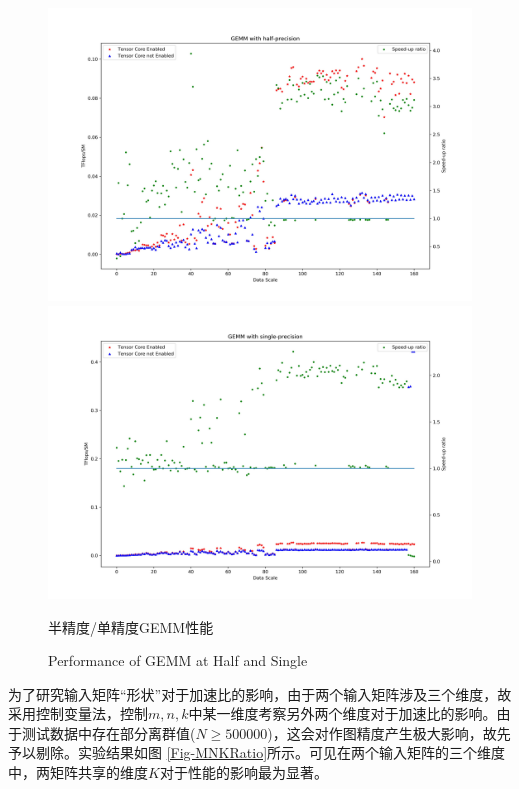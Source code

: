 \begin{figure}
	\centering
	\includegraphics[width=15cm]{figures/GEMM-Half-TF.jpg}\\
	\includegraphics[width=15cm]{figures/GEMM-Single-TF.jpg}
	\renewcommand{\thefigure}{\arabic{section}-\arabic{figure} }
	\renewcommand{\figurename}{图}
	\caption{半精度/单精度GEMM性能}
	\addtocounter{figure}{-1}
	\renewcommand{\thefigure}{\arabic{section}-\arabic{figure} }
	\renewcommand{\figurename}{Figure}
	\caption{Performance of GEMM at Half and Single}
	\label{Fig-PerfGemm}
\end{figure}
\par 为了研究输入矩阵“形状”对于加速比的影响，由于两个输入矩阵涉及三个维度，故采用控制变量法，控制$ m,n,k $中某一维度考察另外两个维度对于加速比的影响。由于测试数据中存在部分离群值($ N\geq 500000 $)，这会对作图精度产生极大影响，故先予以剔除。实验结果如图 \ref{Fig-MNKRatio}所示。可见在两个输入矩阵的三个维度中，两矩阵共享的维度$ K $对于性能的影响最为显著。
